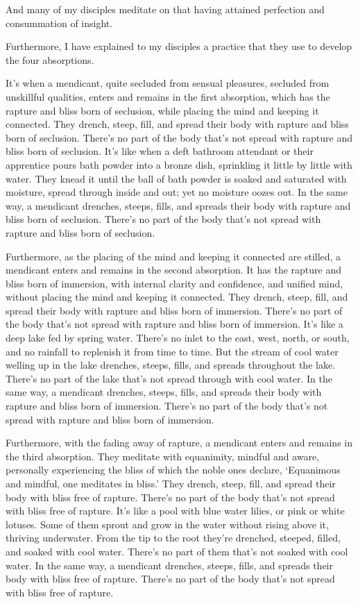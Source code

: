 \documentclass[12pt,openany]{book}%
\begin{document}
And many of my disciples meditate on that having attained perfection and consummation of insight. 

Furthermore, I have explained to my disciples a practice that they use to develop the four absorptions. 

It’s when a mendicant, quite secluded from sensual pleasures, secluded from unskillful qualities, enters and remains in the first absorption, which has the rapture and bliss born of seclusion, while placing the mind and keeping it connected. They drench, steep, fill, and spread their body with rapture and bliss born of seclusion. There’s no part of the body that’s not spread with rapture and bliss born of seclusion. It’s like when a deft bathroom attendant or their apprentice pours bath powder into a bronze dish, sprinkling it little by little with water. They knead it until the ball of bath powder is soaked and saturated with moisture, spread through inside and out; yet no moisture oozes out. In the same way, a mendicant drenches, steeps, fills, and spreads their body with rapture and bliss born of seclusion. There’s no part of the body that’s not spread with rapture and bliss born of seclusion. 

Furthermore, as the placing of the mind and keeping it connected are stilled, a mendicant enters and remains in the second absorption. It has the rapture and bliss born of immersion, with internal clarity and confidence, and unified mind, without placing the mind and keeping it connected. They drench, steep, fill, and spread their body with rapture and bliss born of immersion. There’s no part of the body that’s not spread with rapture and bliss born of immersion. It’s like a deep lake fed by spring water. There’s no inlet to the east, west, north, or south, and no rainfall to replenish it from time to time. But the stream of cool water welling up in the lake drenches, steeps, fills, and spreads throughout the lake. There’s no part of the lake that’s not spread through with cool water. In the same way, a mendicant drenches, steeps, fills, and spreads their body with rapture and bliss born of immersion. There’s no part of the body that’s not spread with rapture and bliss born of immersion. 

Furthermore, with the fading away of rapture, a mendicant enters and remains in the third absorption. They meditate with equanimity, mindful and aware, personally experiencing the bliss of which the noble ones declare, ‘Equanimous and mindful, one meditates in bliss.’ They drench, steep, fill, and spread their body with bliss free of rapture. There’s no part of the body that’s not spread with bliss free of rapture. It’s like a pool with blue water lilies, or pink or white lotuses. Some of them sprout and grow in the water without rising above it, thriving underwater. From the tip to the root they’re drenched, steeped, filled, and soaked with cool water. There’s no part of them that’s not soaked with cool water. In the same way, a mendicant drenches, steeps, fills, and spreads their body with bliss free of rapture. There’s no part of the body that’s not spread with bliss free of rapture. 
\end{document}
